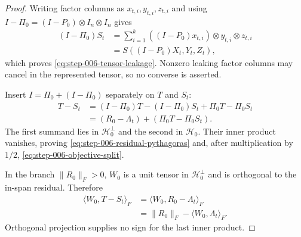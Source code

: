 \begin{proof}
Writing factor columns as $x_{t,i},y_{t,i},z_{t,i}$ and using
$I-\Pi_0=(I-P_0)\otimes I_n\otimes I_n$ gives
\[
 \begin{aligned}
 (I-\Pi_0)S_t
 &=\sum_{i=1}^k((I-P_0)x_{t,i})\otimes y_{t,i}\otimes z_{t,i}\\
 &=S((I-P_0)X_t,Y_t,Z_t),
 \end{aligned}
\]
which proves \eqref{eq:step-006-tensor-leakage}.  Nonzero leaking factor
columns may cancel in the represented tensor, so no converse is asserted.

Insert $I=\Pi_0+(I-\Pi_0)$ separately on $T$ and $S_t$:
\[
 \begin{aligned}
 T-S_t
 &=(I-\Pi_0)T-(I-\Pi_0)S_t+\Pi_0T-\Pi_0S_t\\
 &=(R_0-\Lambda_t)+(\Pi_0T-\Pi_0S_t).
 \end{aligned}
\]
The first summand lies in $\mathcal H_0^\perp$ and the second in
$\mathcal H_0$.  Their inner product vanishes, proving
\eqref{eq:step-006-residual-pythagoras} and, after multiplication by $1/2$,
\eqref{eq:step-006-objective-split}.

In the branch $\|R_0\|_F>0$, $W_0$ is a unit tensor in
$\mathcal H_0^\perp$ and is orthogonal to the in-span residual.  Therefore
\[
 \begin{aligned}
 \langle W_0,T-S_t\rangle_F
 &=\langle W_0,R_0-\Lambda_t\rangle_F\\
 &=\|R_0\|_F-\langle W_0,\Lambda_t\rangle_F.
 \end{aligned}
\]
Orthogonal projection supplies no sign for the last inner product.
\end{proof}


